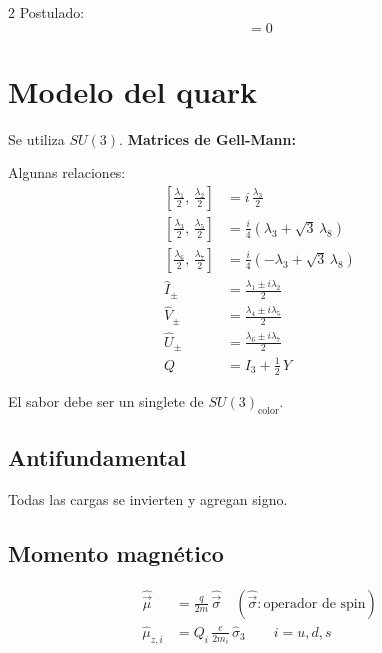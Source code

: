 \documentclass[a4paper, 12pt]{article}
\begin{document}
\begin{multicols}{2}
Postulado:
\begin{equation*}
    [\hat{H}_{F},\, \hat{I}_{j}] = 0
\end{equation*}

\section*{Modelo del quark}

Se utiliza $SU(3)$. \textbf{Matrices de Gell-Mann:}

Algunas relaciones:
\begin{align*}
    \left[\tfrac{\lambda_{1}}{2},\, \tfrac{\lambda_{2}}{2}\right]
        &= i\,\tfrac{\lambda_{3}}{2}                                   \\
    \left[\tfrac{\lambda_{3}}{2},\, \tfrac{\lambda_{5}}{2}\right]
        &= \tfrac{i}{4}\!\left(\lambda_{3} + \sqrt{3}\,\lambda_{8}\right) \\
    \left[\tfrac{\lambda_{6}}{2},\, \tfrac{\lambda_{7}}{2}\right]
        &= \tfrac{i}{4}\!\left(-\lambda_{3} + \sqrt{3}\,\lambda_{8}\right) \\
    \hat{I}_{\pm}
        &= \frac{\lambda_{1} \pm i\lambda_{2}}{2}                     \\
    \hat{V}_{\pm}
        &= \frac{\lambda_{4} \pm i\lambda_{5}}{2}                     \\
    \hat{U}_{\pm}
        &= \frac{\lambda_{6} \pm i\lambda_{7}}{2}                     \\
    Q   &= I_{3} + \tfrac{1}{2}\,Y
\end{align*}

El sabor debe ser un singlete de $SU(3)_{\text{color}}$.

\subsection*{Antifundamental}
Todas las cargas se invierten y agregan signo.

\subsection*{Momento magnético}
\begin{align*}
    \hat{\vec{\mu}}
        &= \frac{q}{2m}\,\hat{\vec{\sigma}}
            \quad (\hat{\vec{\sigma}}: \text{operador de spin})        \\
    \hat{\mu}_{z,i}
        &= Q_{i}\,\frac{e}{2m_{i}}\,\hat{\sigma}_{3}
            \qquad i = u, d, s
\end{align*}


\end{multicols}
\end{document}
